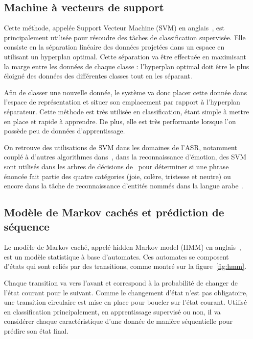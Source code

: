 \subsection{Machine à vecteurs de support}
Cette méthode, appelée Support Vecteur Machine (SVM) en anglais~\cite{Cortes1995}, est principalement utilisée pour résoudre des tâches de classification supervisée. Elle consiste en la séparation linéaire des données projetées dans un espace en utilisant un hyperplan optimal. Cette séparation va être effectuée en maximisant la marge entre les données de chaque classe : l'hyperplan optimal doit être le plus éloigné des données des différentes classes tout en les séparant.

Afin de classer une nouvelle donnée, le système va donc placer cette donnée dans l'espace de représentation et situer son emplacement par rapport à l'hyperplan séparateur.
Cette méthode est très utilisée en classification, étant simple à mettre en place et rapide à apprendre. De plus, elle est très performante lorsque l'on possède peu de données d'apprentissage.

On retrouve des utilisations de SVM dans les domaines de l'ASR, notamment couplé à d'autres algorithmes dans~\cite{Solera2007}, dans la reconnaissance d'émotion, des SVM sont utilisés dans les arbres de décisions de~\cite{Rozgic2012} pour déterminer si une phrase énoncée fait partie des quatre catégories (joie, colère, tristesse et neutre) ou encore dans la tâche de reconnaissance d'entités nommés dans la langue arabe~\cite{Benajiba2008}.

\subsection{Modèle de Markov cachés et prédiction de séquence}

Le modèle de Markov caché, appelé hidden Markov model (HMM) en anglais~\cite{Rabiner1986}, est un modèle statistique à base d'automates. Ces automates se composent d'états qui sont reliés par des transitions, comme montré sur la figure~\ref{fig:hmm}.



Chaque transition va vers l'avant et correspond à la probabilité de changer de l'état courant pour le suivant. Comme le changement d'état n'est pas obligatoire, une transition circulaire est mise en place pour boucler sur l'état courant.
Utilisé en classification principalement, en apprentissage supervisé ou non, il va considérer chaque caractéristique d'une donnée de manière séquentielle pour prédire son état final.

